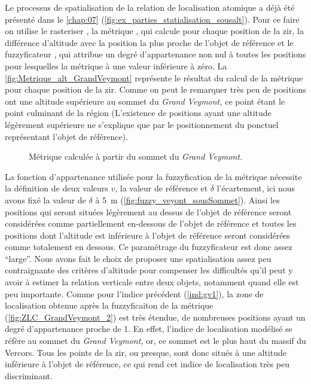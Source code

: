 Le processus de spatialisation de la relation de localisation atomique
 a déjà été présenté dans le
\autoref{chap:07}
(\autoref{fig:ex_parties_statialisation_sousalt}). Pour ce faire on
utilise le rasteriser , la métrique
, qui calcule pour chaque position de
la \ac{zir}, la différence d'altitude avec la position la plus proche
de l'objet de référence et le fuzzyficateur ,
qui attribue un degré d'appartenance non nul à toutes les positions
pour lesquelles la métrique à une valeur inférieure à zéro. La
\autoref{fig:Metrique_alt_GrandVeymont} représente le résultat du
calcul de la métrique pour chaque position de la \ac{zir}. Comme on
peut le remarquer très peu de positions ont une altitude supérieure au
sommet du \emph{Grand Veymont,} ce point étant le point culminant de
la région (L’existence de positions ayant une altitude légèrement
supérieure ne s'explique que par le positionnement du ponctuel
représentant l'objet de référence).

\begin{figure}
  \centering
  
  \caption{Métrique \protect{} calculée
    à partir du sommet du \emph{Grand Veymont.}}
  \label{fig:Metrique_alt_GrandVeymont}
\end{figure}

La fonction d'appartenance utilisée pour la fuzzyfication de la
métrique nécessite la définition de deux valeurs \(v\), la valeur de
référence et \(\delta\) l'écartement, ici nous avons fixé la valeur de
\(\delta\) à \SI{5}{\meter}
(\autoref{fig:fuzzy_veyont_sousSommet}). Ainsi les positions qui
seront situées légèrement au dessus de l'objet de référence seront
considérées comme partiellement en-dessous de l'objet de référence et
toutes les positions dont l'altitude est inférieure à l'objet de
référence seront considérées comme totalement en dessous. Ce
paramétrage du fuzzyficateur  est donc assez
\enquote{large}. Nous avons fait le choix de proposer une
spatialisation assez peu contraignante des critères d'altitude pour
compenser les difficultés qu'il peut y avoir à estimer la relation
verticale entre deux objets, notamment quand elle est peu importante.
Comme pour l'indice précédent (\ref{ind:gv1}), la zone de localisation
obtenue après la fuzzyficaiton de la métrique
(\autoref{fig:ZLC_GrandVeymont_2}) est très étendue, de nombreuses
positions ayant un degré d'appartenance proche de 1. En effet,
l'indice de localisation modélisé se réfère au sommet du \emph{Grand
  Veymont,} or, ce sommet est le plus haut du massif du Vercors. Tous
les points de la \ac{zir}, ou presque, sont donc situés à une altitude
inférieure à l'objet de référence, ce qui rend cet indice de
localisation très peu discriminant.

